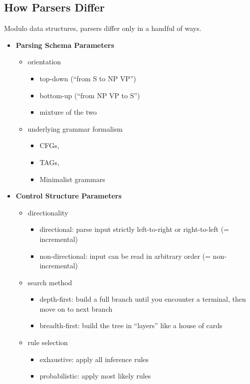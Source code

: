 \subsection{How Parsers Differ}
\label{sub:ParserOverview_Parameters}
Modulo data structures, parsers differ only in a handful of ways.

\begin{itemize}
    \item \textbf{Parsing Schema Parameters}
        \begin{itemize}
            \item orientation
                \begin{itemize}
                    \item top-down (``from S to NP VP'')
                    \item bottom-up (``from NP VP to S'')
                    \item mixture of the two
                \end{itemize}
            \item underlying grammar formalism
                \begin{itemize}
                    \item CFGs,
                    \item TAGs,
                    \item Minimalist grammars
                \end{itemize}
        \end{itemize}
    \item \textbf{Control Structure Parameters}
        \begin{itemize}
            \item directionality
                \begin{itemize}
                    \item directional: parse input strictly left-to-right or right-to-left (= incremental)
                    \item non-directional: input can be read in arbitrary order (= non-incremental)
                \end{itemize}
            \item search method
                \begin{itemize}
                    \item depth-first: build a full branch until you encounter a terminal, then move on to next branch
                    \item breadth-first: build the tree in ``layers'' like a house of cards
                \end{itemize}
            \item rule selection
                \begin{itemize}
                    \item exhaustive: apply all inference rules
                    \item probabilistic: apply most likely rules
                \end{itemize}
        \end{itemize}
\end{itemize}

